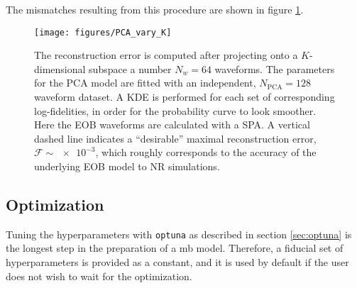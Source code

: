 \documentclass[main.tex]{subfiles}
\begin{document}
The mismatches resulting from this procedure are shown in figure \ref{fig:PCA_vary_K}.

\begin{figure}[ht]
\centering
\texttt{[image: figures/PCA\_vary\_K]}
\caption{The reconstruction error is computed after projecting onto a \(K\)-dimensional subspace a number \(N_w=64\) waveforms. The parameters for the \ac{PCA} model are fitted with an independent, \(N _{\text{PCA}} = 128\) waveform dataset. A \ac{KDE} is performed for each set of corresponding log-fidelities, in order for the probability curve to look smoother.
Here the \ac{EOB} waveforms are calculated with a \ac{SPA}. 
A vertical dashed line indicates a ``desirable'' maximal reconstruction error, \(\mathcal{F} \sim \num{e-3}\), which roughly corresponds to the accuracy of the underlying \ac{EOB} model to \ac{NR} simulations.
}
\label{fig:PCA_vary_K}
\end{figure}

\subsection{Optimization} \label{sec:optimization}

Tuning the hyperparameters with \texttt{optuna} as described in section \ref{sec:optuna} is the longest step in the preparation of a \ac{mb} model. 
Therefore, a fiducial set of hyperparameters is provided as a constant, and it is used by default if the user does not wish to wait for the optimization. 
\end{document}
